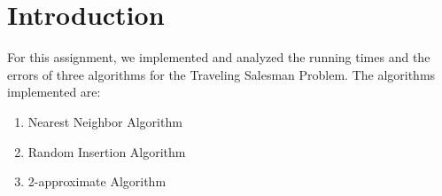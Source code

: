 \section{Introduction}\label{intro}
For this assignment, we implemented and analyzed the running times and the errors of three algorithms for the Traveling Salesman Problem. 
The algorithms implemented are:
\begin{enumerate}
	\item Nearest Neighbor Algorithm
	\item Random Insertion Algorithm
	\item 2-approximate Algorithm
\end{enumerate}


\pagebreak
